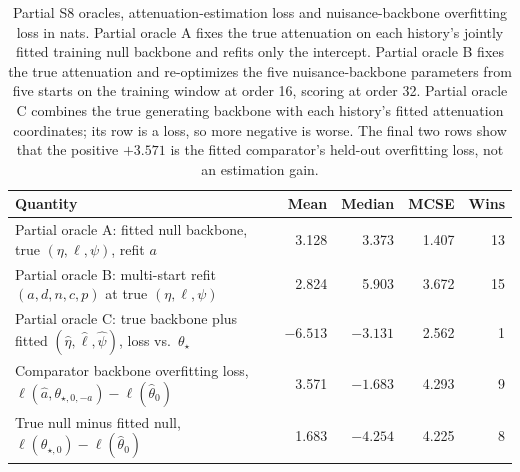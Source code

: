 \begin{table}[htbp]\centering\small
\setlength{\tabcolsep}{4pt}
\begin{tabular}{@{}lrrrr@{}}\toprule
Quantity & Mean & Median & MCSE & Wins\\\midrule
Partial oracle A: fitted null backbone, true $(\eta,\ell,\psi)$, refit $a$ & 3.128 & 3.373 & 1.407 & 13 \\
Partial oracle B: multi-start refit $(a,d,n,c,p)$ at true $(\eta,\ell,\psi)$ & 2.824 & 5.903 & 3.672 & 15 \\
Partial oracle C: true backbone plus fitted $(\hat\eta,\hat\ell,\hat\psi)$, loss vs.\ $\theta_\star$ & $-6.513$ & $-3.131$ & 2.562 & 1 \\
Comparator backbone overfitting loss, $\ell(\hat a,\theta_{\star,0,-a})-\ell(\hat\theta_0)$ & 3.571 & $-1.683$ & 4.293 & 9 \\
True null minus fitted null, $\ell(\theta_{\star,0})-\ell(\hat\theta_0)$ & 1.683 & $-4.254$ & 4.225 & 8 \\
\bottomrule\end{tabular}
\caption{Partial S8 oracles, attenuation-estimation loss and nuisance-backbone overfitting loss in nats. Partial oracle A fixes the true attenuation on each history's jointly fitted training null backbone and refits only the intercept. Partial oracle B fixes the true attenuation and re-optimizes the five nuisance-backbone parameters from five starts on the training window at order 16, scoring at order 32. Partial oracle C combines the true generating backbone with each history's fitted attenuation coordinates; its row is a loss, so more negative is worse. The final two rows show that the positive $+3.571$ is the fitted comparator's held-out overfitting loss, not an estimation gain.}
\label{tab:s8-partial-oracle}
\end{table}
